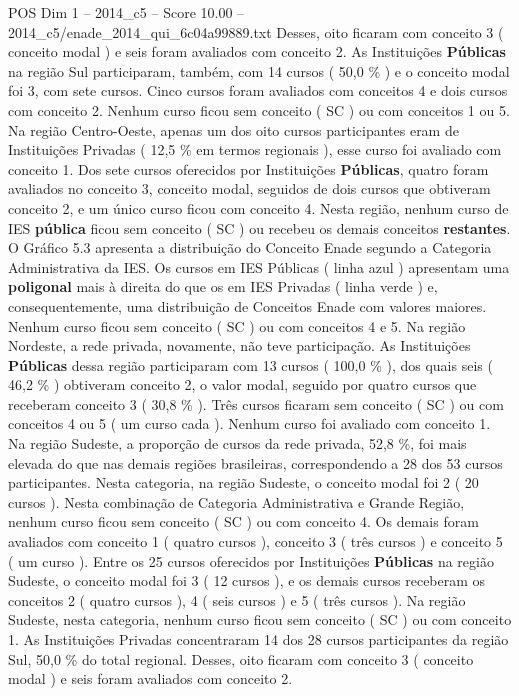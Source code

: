 \begin{textsample}{POS Dim 1 – 2014\_c5 – Score 10.00 – 2014\_c5/enade\_2014\_qui\_6c04a99889.txt}
Desses, oito ficaram com conceito 3 ( conceito modal ) e seis foram avaliados com conceito 2.
As Instituições \textbf{Públicas} na região Sul participaram, também, com 14 cursos ( 50,0 \% ) e o conceito modal foi 3, com sete cursos.
Cinco cursos foram avaliados com conceitos 4 e dois cursos com conceito 2.
Nenhum curso ficou sem conceito ( SC ) ou com conceitos 1 ou 5.
Na região Centro-Oeste, apenas um dos oito cursos participantes eram de Instituições Privadas ( 12,5 \% em termos regionais ), esse curso foi avaliado com conceito 1.
Dos sete cursos oferecidos por Instituições \textbf{Públicas}, quatro foram avaliados no conceito 3, conceito modal, seguidos de dois cursos que obtiveram conceito 2, e um único curso ficou com conceito 4.
Nesta região, nenhum curso de IES \textbf{pública} ficou sem conceito ( SC ) ou recebeu os demais conceitos \textbf{restantes}.
O Gráfico 5.3 apresenta a distribuição do Conceito Enade segundo a Categoria Administrativa da IES.
Os cursos em IES Públicas ( linha azul ) apresentam uma \textbf{poligonal} mais à direita do que os em IES Privadas ( linha verde ) e, consequentemente, uma distribuição de Conceitos Enade com valores maiores.
Nenhum curso ficou sem conceito ( SC ) ou com conceitos 4 e 5.
Na região Nordeste, a rede privada, novamente, não teve participação.
As Instituições \textbf{Públicas} dessa região participaram com 13 cursos ( 100,0 \% ), dos quais seis ( 46,2 \% ) obtiveram conceito 2, o valor modal, seguido por quatro cursos que receberam conceito 3 ( 30,8 \% ).
Três cursos ficaram sem conceito ( SC ) ou com conceitos 4 ou 5 ( um curso cada ).
Nenhum curso foi avaliado com conceito 1.
Na região Sudeste, a proporção de cursos da rede privada, 52,8 \%, foi mais elevada do que nas demais regiões brasileiras, correspondendo a 28 dos 53 cursos participantes.
Nesta categoria, na região Sudeste, o conceito modal foi 2 ( 20 cursos ).
Nesta combinação de Categoria Administrativa e Grande Região, nenhum curso ficou sem conceito ( SC ) ou com conceito 4.
Os demais foram avaliados com conceito 1 ( quatro cursos ), conceito 3 ( três cursos ) e conceito 5 ( um curso ).
Entre os 25 cursos oferecidos por Instituições \textbf{Públicas} na região Sudeste, o conceito modal foi 3 ( 12 cursos ), e os demais cursos receberam os conceitos 2 ( quatro cursos ), 4 ( seis cursos ) e 5 ( três cursos ).
Na região Sudeste, nesta categoria, nenhum curso ficou sem conceito ( SC ) ou com conceito 1.
As Instituições Privadas concentraram 14 dos 28 cursos participantes da região Sul, 50,0 \% do total regional.
Desses, oito ficaram com conceito 3 ( conceito modal ) e seis foram avaliados com conceito 2.

\end{textsample}
